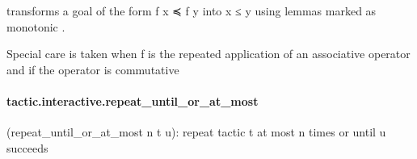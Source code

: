 \documentclass{article}
\begin{document}
\par
transforms a goal of the form 
\colorbox[RGB]{253,246,227}{{{{\color[RGB]{101, 123, 131} f x ≼ f y }}}} into 
\colorbox[RGB]{253,246,227}{{{{\color[RGB]{101, 123, 131} x  }}}{{{\color[RGB]{181, 137, 0} ≤ }}}{{{\color[RGB]{101, 123, 131}  y }}}} using lemmas
marked as 
\colorbox[RGB]{253,246,227}{{{{\color[RGB]{101, 123, 131} monotonic }}}}.
\par
Special care is taken when 
\colorbox[RGB]{253,246,227}{{{{\color[RGB]{101, 123, 131} f }}}} is the repeated application of an
associative operator and if the operator is commutative
\paragraph{tactic.interactive.repeat\_until\_or\_at\_most}
\par
(repeat\_until\_or\_at\_most n t u): repeat tactic 
\colorbox[RGB]{253,246,227}{{{{\color[RGB]{101, 123, 131} t }}}} at most n times or until u succeeds
\end{document}
